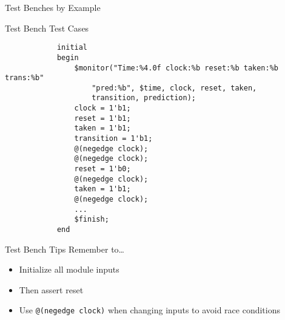 \documentclass[table,dvipsnames,colorlinks=true]{beamer}
\begin{document}
\begin{frame}[fragile]{Test Benches by Example}
    \begin{block}{Test Bench Test Cases}
        \vspace*{-12pt}
        \begin{verbatim}
            initial
            begin
                $monitor("Time:%4.0f clock:%b reset:%b taken:%b trans:%b"
                    "pred:%b", $time, clock, reset, taken,
                    transition, prediction);
                clock = 1'b1;
                reset = 1'b1;
                taken = 1'b1;
                transition = 1'b1;
                @(negedge clock);
                @(negedge clock);
                reset = 1'b0;
                @(negedge clock);
                taken = 1'b1;
                @(negedge clock);
                ...
                $finish;
            end
        \end{verbatim}
    \end{block}
\end{frame}

\begin{frame}{Test Bench Tips}
    Remember to\dots
    \begin{itemize}
        \item Initialize all module inputs
        \item Then assert reset
        \item Use \texttt{@(negedge clock)} when changing inputs to avoid race
            conditions
    \end{itemize}
\end{frame}
\end{document}

